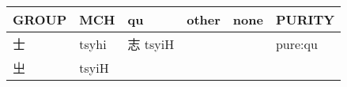 \documentclass[14pt,a4paper]{scrartcl}
\begin{document}
\begin{longtable}[c]{@{}llllll@{}}
\toprule
\begin{minipage}[b]{0.14\columnwidth}\raggedright\strut
GROUP
\strut\end{minipage} &
\begin{minipage}[b]{0.14\columnwidth}\raggedright\strut
MCH
\strut\end{minipage} &
\begin{minipage}[b]{0.14\columnwidth}\raggedright\strut
qu
\strut\end{minipage} &
\begin{minipage}[b]{0.14\columnwidth}\raggedright\strut
other
\strut\end{minipage} &
\begin{minipage}[b]{0.14\columnwidth}\raggedright\strut
none
\strut\end{minipage} &
\begin{minipage}[b]{0.14\columnwidth}\raggedright\strut
PURITY
\strut\end{minipage}\tabularnewline
\midrule
\endhead
\begin{minipage}[t]{0.14\columnwidth}\raggedright\strut
士
\strut\end{minipage} &
\begin{minipage}[t]{0.14\columnwidth}\raggedright\strut
tsyhi
\strut\end{minipage} &
\begin{minipage}[t]{0.14\columnwidth}\raggedright\strut
志 tsyiH
\strut\end{minipage} &
\begin{minipage}[t]{0.14\columnwidth}\raggedright\strut
\strut\end{minipage} &
\begin{minipage}[t]{0.14\columnwidth}\raggedright\strut
\strut\end{minipage} &
\begin{minipage}[t]{0.14\columnwidth}\raggedright\strut
pure:qu
\strut\end{minipage}\tabularnewline
\begin{minipage}[t]{0.14\columnwidth}\raggedright\strut
㞢
\strut\end{minipage} &
\begin{minipage}[t]{0.14\columnwidth}\raggedright\strut
tsyiH
\strut\end{minipage} &
\begin{minipage}[t]{0.14\columnwidth}\raggedright\strut
\strut\end{minipage} &
\begin{minipage}[t]{0.14\columnwidth}\raggedright\strut

\end{minipage}
\end{longtable}
\end{document}
